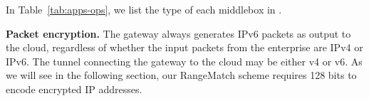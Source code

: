   
 
 

 
 
  In Table~\ref{tab:apps-ops}, we list the type of each  middlebox in \sys. 
  


\noindent\textbf{Packet encryption.}
The gateway always generates IPv6 packets as output to the cloud, regardless of whether the input packets from the enterprise are IPv4 or IPv6. The tunnel connecting the gateway to the cloud may be either v4 or v6.
As we will see in the following section, our RangeMatch scheme requires 128 bits to encode encrypted IP addresses.

